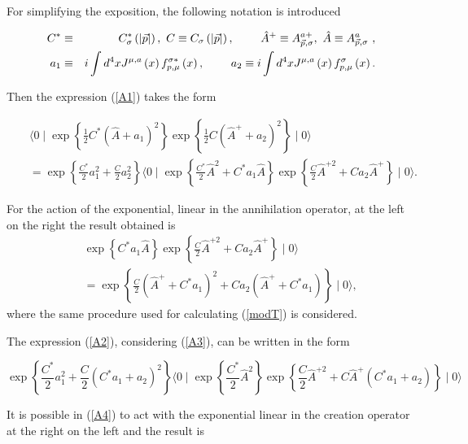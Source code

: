 \documentclass[12pt,letterpaper]{report}
\begin{document}
For simplifying the exposition, the following notation is
introduced

\begin{eqnarray}
C^{*} &\equiv &C_\sigma ^{*}\left(\left| \vec{p}\right| \right),\
C\equiv C_\sigma \left(\left| \vec{p}\right| \right),\text{ \qquad
}\hat{A} ^{+}\equiv A_{\vec{p},\sigma }^{a+},\ \hat{A}\equiv
A_{\vec{p},\sigma }^a \text{\ }, \nonumber \\ a_1 &\equiv &i\int
d^4xJ^{\mu,a}\left(x\right) f_{p,\mu }^{\sigma
*}\left(x\right),\text{ \qquad }a_2\equiv i\int d^4xJ^{\mu
,a}\left(x\right) f_{p,\mu }^\sigma \left(x\right). \label{nota1}
\end{eqnarray}

Then the expression (\ref{A1}) takes the form

\begin{eqnarray}
&&\langle 0 \mid \exp \left\{ \frac 12C^{*}\left(
\hat{A}+a_1\right) ^2\right\} \exp \left\{ \frac 12C\left(
\hat{A}^{+}+a_2\right) ^2\right\} \mid 0\rangle \label{A2}
\\ &&=\exp \left\{ \frac{C^{*}}2a_1^2+\frac C2a_2^2\right\}
\langle 0\mid \exp \left\{ \frac{C^{*}}2\hat{A}^2
+C^{*}a_1\hat{A}\right\} \exp \left\{ \frac C2
\hat{A}^{+2}+Ca_2\hat{A}^{+}\right\} \mid 0\rangle. \nonumber
\end{eqnarray}

For the action of the exponential, linear in the annihilation
operator, at the left on the right the result obtained is
\begin{eqnarray}
&&\exp \left\{ C^{*}a_1\hat{A}\right\} \exp \left\{ \frac
C2\hat{A} ^{+2}+Ca_2\hat{A}^{+}\right\} \mid 0\rangle \nonumber
\\ &&=\exp \left\{ \frac C2\left(\hat{A}^{+}+C^{*}a_1\right)
^2+Ca_2\left(\hat{A}^{+}+C^{*}a_1\right) \right\} \mid 0\rangle,
\label{A3}
\end{eqnarray}
where the same procedure used for calculating (\ref{modT}) is
considered.

The expression (\ref{A2}), considering (\ref{A3}), can be written
in the form

\begin{equation}
\exp \left\{ \frac{C^{*}}2a_1^2+\frac C2\left(
C^{*}a_{1}+a_2\right) ^2\right\} \langle 0\mid \exp \left\{
\frac{C^{*}}2\hat{A}^2\right\} \exp \left\{ \frac
C2\hat{A}^{+2}+C\hat{A}^{+}\left(C^{*}a_{1}+a_2\right) \right\}
\mid 0\rangle \label{A4}
\end{equation}

It is possible in (\ref{A4}) to act with the exponential linear in
the creation operator at the right on the left and the result is
\end{document}
